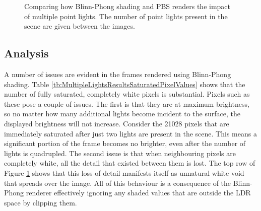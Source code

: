 \begin{figure}[h]
	\caption{Comparing how Blinn-Phong shading and PBS renders the impact of multiple point lights. The number of point lights present in the scene are given between the images.}
	\label{fig:MultipleLightsResultsFrames}
\end{figure}

\begin{table}
	\renewcommand{\arraystretch}{0.95}
	\caption{The number of fully saturated pixels in the rendered frames of the two shading models, broken down by number of point lights.}
	\label{tb:MultipleLightsResultsSaturatedPixelValues}
\end{table}

\subsection{Analysis}

A number of issues are evident in the frames rendered using Blinn-Phong shading. Table \ref{tb:MultipleLightsResultsSaturatedPixelValues} shows that the number of fully saturated, completely white pixels is substantial. Pixels such as these pose a couple of issues. The first is that they are at maximum brightness, so no matter how many additional lights become incident to the surface, the displayed brightness will not increase. Consider the 21028 pixels that are immediately saturated after just two lights are present in the scene. This means a significant portion of the frame becomes no brighter, even after the number of lights is quadrupled. The second issue is that when neighbouring pixels are completely white, all the detail that existed between them is lost. The top row of Figure \ref{fig:MultipleLightsResultsFrames} shows that this loss of detail manifests itself as unnatural white void that spreads over the image. All of this behaviour is a consequence of the Blinn-Phong renderer effectively ignoring any shaded values that are outside the LDR space by clipping them.

